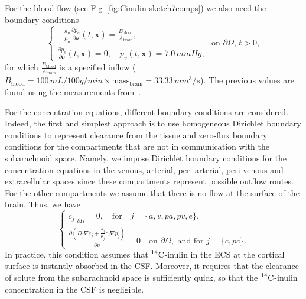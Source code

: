 \documentclass[10pt,letterpaper]{article}
\newcommand{\1}{^{(1)}}
\newcommand{\2}{^{(2)}}
\newcommand{\Cinulin}{$\prescript{14}{}{\text{C}}$-inulin }
\begin{document}
For the blood flow (see Fig~\ref{fig:Cinulin-sketch7comps}) we also need the boundary conditions
\begin{equation}
\begin{cases}
    -\frac{\kappa_{a}}{\mu_{a}}\frac{\partial p_{a}}{\partial \pmb{\nu}}(t,\mathbf x)  = \frac{B_\text{blood}}{A_\text{brain}}, \\
    \frac{\partial p_{c}}{\partial \pmb{\nu}}(t,\mathbf x) = 0, \quad p_{v}(t,\mathbf x) = 7.0\, \si{mmHg}, 
\end{cases}
\text{ on } \partial \Omega, \, t>0,
    \label{eq:BC-4compsblood}
\end{equation}
for which $\frac{B_\text{blood}}{A_\text{brain}} $ is a specified inflow ($B_\text{blood}=100\, \si{mL/100g/min} \times \text{mass}_\text{brain} = 33.33 \,\si{mm^3/s}$). 
The previous values are found using the measurements from~\cite{mayhan_role_1986}.


For the concentration equations, different boundary conditions are considered. 
Indeed, the first and simplest approach is to use homogeneous Dirichlet boundary conditions to represent clearance from the tissue and zero-flux boundary conditions for the compartments that are not in communication with the subarachnoid space. Namely, we impose Dirichlet boundary conditions for the concentration equations in the venous, arterial, peri-arterial, peri-venous and extracellular spaces since these compartments represent possible outflow routes. For the other compartments we assume that there is no flow at the surface of the brain. Thus, we have
\begin{equation*}
    \begin{cases}
    c_j \big|_{\partial \Omega} =  0 ,\quad \text{for}\quad j=\{a,v,pa,pv,e \}, \\
    \frac{\partial\left( D_j \nabla c_j + \frac{\kappa_j}{\mu_j}c_j \nabla p_j\right)}{\partial \nu}  = 0\quad \text{on } \partial \Omega, \text{ and for } j = \{c,pc\}.
    \end{cases}
\end{equation*}
In practice, this condition assumes that \Cinulin in the ECS at the cortical surface is instantly absorbed in the CSF. Moreover, it requires that the clearance of solute from the subarachnoid space is sufficiently quick, so that the \Cinulin concentration in the CSF is negligible. 
\end{document}
